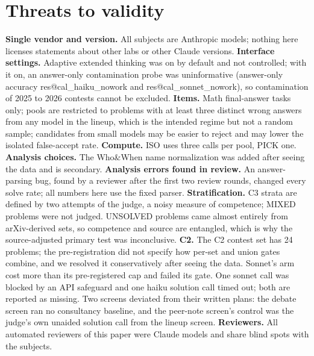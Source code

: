 \documentclass[10pt,twocolumn]{article}
\makeatletter
\newcommand{\res}[1]{\csname res@#1\endcsname}
\makeatother
\begin{document}
\section{Threats to validity}
\textbf{Single vendor and version.} All subjects are Anthropic models; nothing here licenses statements about other labs or other Claude versions. \textbf{Interface settings.} Adaptive extended thinking was on by default and not controlled; with it on, an answer-only contamination probe was uninformative (answer-only accuracy \res{cal_haiku_nowork} and \res{cal_sonnet_nowork}), so contamination of 2025 to 2026 contests cannot be excluded. \textbf{Items.} Math final-answer tasks only; pools are restricted to problems with at least three distinct wrong answers from any model in the lineup, which is the intended regime but not a random sample; candidates from small models may be easier to reject and may lower the isolated false-accept rate. \textbf{Compute.} ISO uses three calls per pool, PICK one. \textbf{Analysis choices.} The Who\&When name normalization was added after seeing the data and is secondary. \textbf{Analysis errors found in review.} An answer-parsing bug, found by a reviewer after the first two review rounds, changed every solve rate; all numbers here use the fixed parser. \textbf{Stratification.} C3 strata are defined by two attempts of the judge, a noisy measure of competence; MIXED problems were not judged. UNSOLVED problems came almost entirely from arXiv-derived sets, so competence and source are entangled, which is why the source-adjusted primary test was inconclusive. \textbf{C2.} The C2 contest set has 24 problems; the pre-registration did not specify how per-set and union gates combine, and we resolved it conservatively after seeing the data. Sonnet's arm cost more than its pre-registered cap and failed its gate. One sonnet call was blocked by an API safeguard and one haiku solution call timed out; both are reported as missing. Two screens deviated from their written plans: the debate screen ran no consultancy baseline, and the peer-note screen's control was the judge's own unaided solution call from the lineup screen. \textbf{Reviewers.} All automated reviewers of this paper were Claude models and share blind spots with the subjects.
\end{document}

